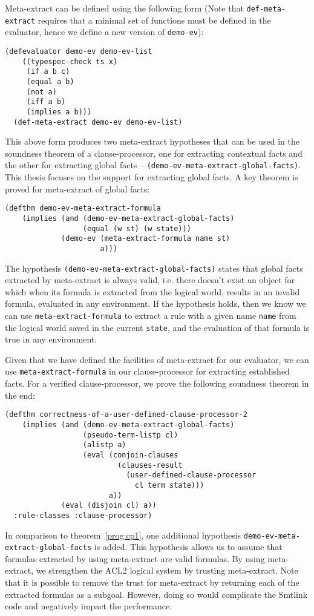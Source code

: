 Meta-extract can be defined using the following form (Note that
\texttt{def-meta-extract} requires that a minimal set of functions must be
defined in the evaluator, hence we define a new version of \texttt{demo-ev}):
\begin{lstlisting}[style=lisp]
  (defevaluator demo-ev demo-ev-list
    ((typespec-check ts x)
     (if a b c)
     (equal a b)
     (not a)
     (iff a b)
     (implies a b)))
  (def-meta-extract demo-ev demo-ev-list)
\end{lstlisting}
This above form produces two meta-extract hypotheses that can be used in the
soundness theorem of a clause-processor, one for extracting contextual facts and
the other for extracting global facts --
\texttt{(demo-ev-meta-extract-global-facts)}. This thesis focuses on the support
for extracting global facts.
A key theorem is proved for meta-extract of global facts:
\begin{lstlisting}[style=lisp]
  (defthm demo-ev-meta-extract-formula
    (implies (and (demo-ev-meta-extract-global-facts)
                  (equal (w st) (w state)))
             (demo-ev (meta-extract-formula name st)
                      a)))
\end{lstlisting}
The hypothesis \texttt{(demo-ev-meta-extract-global-facts)} states that global
facts extracted by meta-extract is always valid, i.e. there doesn't exist an
object for which when its formula is extracted from the logical world, results
in an invalid formula, evaluated in any environment. If the hypothesis holds,
then we know we can use \texttt{meta-extract-formula} to extract a rule with a
given name \texttt{name} from the logical world saved in the current
\texttt{state}, and the evaluation of that formula is true in any environment.

Given that we have defined the facilities of meta-extract for our evaluator, we
can use \texttt{meta-extract-formula} in our clause-processor for extracting
established facts. For a verified clause-processor, we prove the following
soundness theorem in the end:
\begin{lstlisting}[style=lisp]
  (defthm correctness-of-a-user-defined-clause-processor-2
    (implies (and (demo-ev-meta-extract-global-facts)
                  (pseudo-term-listp cl)
                  (alistp a)
                  (eval (conjoin-clauses
                          (clauses-result
                            (user-defined-clause-processor
                              cl term state)))
                        a))
             (eval (disjoin cl) a))
  :rule-classes :clause-processor)
\end{lstlisting}
In comparison to theorem~\ref{prog:cp1}, one additional hypothesis
\texttt{demo-ev-meta-extract-global-facts} is added. This hypothesis allows us
to assume that formulas extracted by using meta-extract are valid formulas. By
using meta-extract, we strengthen the ACL2 logical system by trusting
meta-extract. Note that it is possible to remove the trust for meta-extract by
returning each of the extracted formulas as a subgoal. However, doing so would
complicate the Smtlink code and negatively impact the performance.

